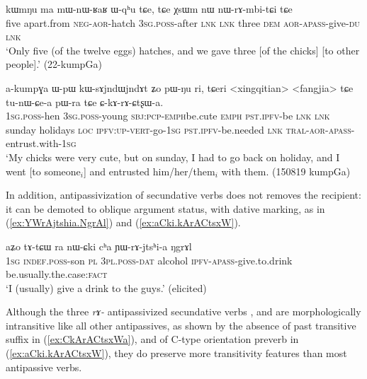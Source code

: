 \begin{exe}
\ex \label{ex:nWrAmbitCi}
\gll   kɯmŋu ma mɯ-nɯ-ʁaʁ ɯ-qʰu tɕe, tɕe χsɯm nɯ nɯ-rɤ-mbi-tɕi tɕe \\
five apart.from \textsc{neg}-\textsc{aor}-hatch \textsc{3sg}.\textsc{poss}-after \textsc{lnk} \textsc{lnk} three \textsc{dem} \textsc{aor}-\textsc{apass}-give-\textsc{du} \textsc{lnk} \\
\glt `Only five (of the twelve eggs) hatches, and we gave three [of the chicks] [to other people].' (22-kumpGa) 
\end{exe}

\begin{exe}
\ex \label{ex:CkArACtsxWa}
\gll  a-kumpɣa ɯ-pɯ kɯ-sɤjndɯ\redp{}jndɤt ʑo pɯ-ŋu ri, tɕeri <xingqitian> <fangjia> tɕe tu-nɯ-ɕe-a pɯ-ra tɕe ɕ-kɤ-rɤ-ɕtʂɯ-a. \\
\textsc{1sg}.\textsc{poss}-hen \textsc{3sg}.\textsc{poss}-young \textsc{sbj}:\textsc{pcp}-\textsc{emph}\redp{}be.cute \textsc{emph} \textsc{pst}.\textsc{ipfv}-be \textsc{lnk} \textsc{lnk} sunday holidays \textsc{loc} \textsc{ipfv}:\textsc{up}-\textsc{vert}-go-\textsc{1sg} \textsc{pst}.\textsc{ipfv}-be.needed \textsc{lnk} \textsc{tral}-\textsc{aor}-\textsc{apass}-entrust.with-\textsc{1sg} \\
\glt `My chicks were very cute, but on sunday, I had to go back on holiday, and I went [to someone$_i$] and entrusted him/her/them$_i$ with them. (150819 kumpGa)
\end{exe}

In addition, antipassivization of secundative verbs does not removes the recipient: it can be demoted to oblique argument status, with dative marking, as in (\ref{ex:YWrAjtshia.NgrAl}) and (\ref{ex:aCki.kArACtsxW}). 
 
\begin{exe}
\ex \label{ex:YWrAjtshia.NgrAl}
\gll  aʑo tɤ-tɕɯ ra nɯ-ɕki cʰa ɲɯ-rɤ-jtsʰi-a ŋgrɤl \\
 \textsc{1sg} \textsc{indef}.\textsc{poss}-son \textsc{pl} \textsc{3pl}.\textsc{poss}-\textsc{dat} alcohol \textsc{ipfv}-\textsc{apass}-give.to.drink be.usually.the.case:\textsc{fact} \\
 \glt `I (usually) give a drink to the guys.' (elicited)
 \end{exe}

Although the three \textit{rɤ-} antipassivized secundative verbs ,  and  are morphologically intransitive like all other antipassives, as shown by the absence of past transitive  suffix in (\ref{ex:CkArACtsxWa}), and of C-type orientation preverb in (\ref{ex:aCki.kArACtsxW}), they do preserve more transitivity features than most antipassive verbs. 

